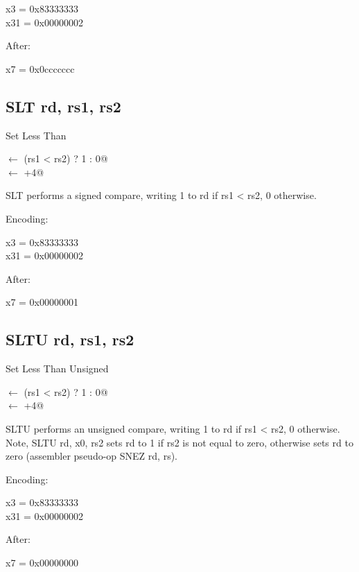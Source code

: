 x3  = 0x83333333\\
x31 = 0x00000002

After:

x7 = 0x0ccccccc


\subsection{SLT rd, rs1, rs2}

Set Less Than

\verb@rd@ $\leftarrow$ \verb@(rs1 < rs2) ? 1 : 0@\\
\verb@pc@ $\leftarrow$ \verb@pc+4@

SLT performs a signed compare, writing 1 to rd if rs1 < rs2, 0 
otherwise.~\cite[p.~15]{rvismv1v22:2017}

Encoding:


x3  = 0x83333333\\
x31 = 0x00000002

After:

x7 = 0x00000001

\subsection{SLTU rd, rs1, rs2}

Set Less Than Unsigned 

\verb@rd@ $\leftarrow$ \verb@(rs1 < rs2) ? 1 : 0@\\
\verb@pc@ $\leftarrow$ \verb@pc+4@

SLTU performs an unsigned compare, writing 1 to rd if rs1 < rs2, 0 otherwise. 
Note, SLTU rd, x0, rs2 sets rd to 1 if rs2 is not equal to zero, otherwise 
sets rd to zero (assembler pseudo-op SNEZ rd, rs).~\cite[p.~15]{rvismv1v22:2017}

Encoding:


x3  = 0x83333333\\
x31 = 0x00000002

After:

x7 = 0x00000000


